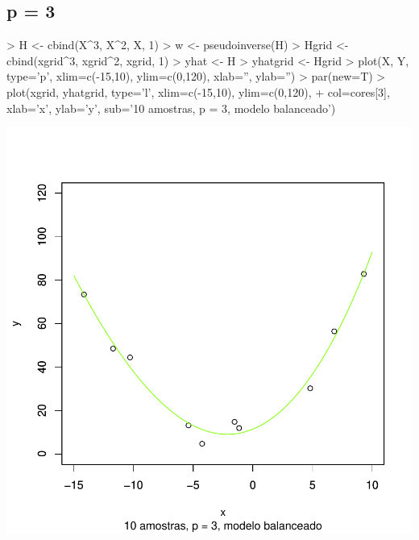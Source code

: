 \documentclass{article}
\begin{document}
\subsection{p = 3}
\begin{Schunk}
\begin{Sinput}
> H <- cbind(X^3, X^2, X, 1)
> w <- pseudoinverse(H) %
> Hgrid <- cbind(xgrid^3, xgrid^2, xgrid, 1)
> yhat <- H %
> yhatgrid <- Hgrid %
> plot(X, Y, type='p', xlim=c(-15,10), ylim=c(0,120), xlab='', ylab='')
> par(new=T)
> plot(xgrid, yhatgrid, type='l', xlim=c(-15,10), ylim=c(0,120),
+      col=cores[3], xlab='x', ylab='y', sub='10 amostras, p = 3, modelo balanceado')
\end{Sinput}
\end{Schunk}
\includegraphics{aprox-004}
\end{document}
